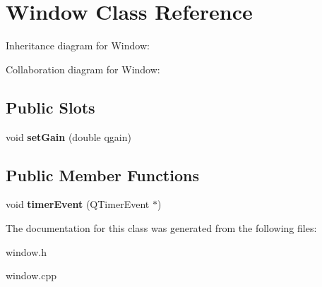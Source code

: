 \hypertarget{classWindow}{}\section{Window Class Reference}
\label{classWindow}


Inheritance diagram for Window\+:


Collaboration diagram for Window\+:
\subsection*{Public Slots}
\begin{DoxyCompactItemize}
\item 
\mbox{\label{classWindow_a403db7ae8b789e851542892ce6208d0d}} 
void {\bfseries set\+Gain} (double qgain)
\end{DoxyCompactItemize}
\subsection*{Public Member Functions}
\begin{DoxyCompactItemize}
\item 
\mbox{\label{classWindow_a3656e486c467d9d7c7933812fb4b8f57}} 
void {\bfseries timer\+Event} (Q\+Timer\+Event $\ast$)
\end{DoxyCompactItemize}


The documentation for this class was generated from the following files\+:\begin{DoxyCompactItemize}
\item 
window.\+h\item 
window.\+cpp\end{DoxyCompactItemize}
